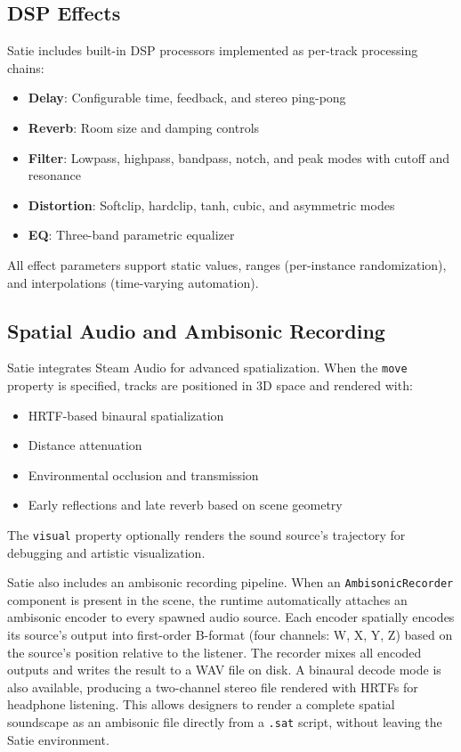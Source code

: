 \documentclass[sigconf,anonymous,review]{nimeart}
\begin{document}
\subsection{DSP Effects}

Satie includes built-in DSP processors implemented as per-track processing chains:

\begin{itemize}
    \item \textbf{Delay}: Configurable time, feedback, and stereo ping-pong
    \item \textbf{Reverb}: Room size and damping controls
    \item \textbf{Filter}: Lowpass, highpass, bandpass, notch, and peak modes with cutoff and resonance
    \item \textbf{Distortion}: Softclip, hardclip, tanh, cubic, and asymmetric modes
    \item \textbf{EQ}: Three-band parametric equalizer
\end{itemize}

All effect parameters support static values, ranges (per-instance randomization), and interpolations (time-varying automation).

\subsection{Spatial Audio and Ambisonic Recording}

Satie integrates Steam Audio for advanced spatialization. When the \texttt{move} property is specified, tracks are positioned in 3D space and rendered with:

\begin{itemize}
    \item HRTF-based binaural spatialization
    \item Distance attenuation
    \item Environmental occlusion and transmission
    \item Early reflections and late reverb based on scene geometry
\end{itemize}

The \texttt{visual} property optionally renders the sound source's trajectory for debugging and artistic visualization.

Satie also includes an ambisonic recording pipeline. When an \texttt{AmbisonicRecorder} component is present in the scene, the runtime automatically attaches an ambisonic encoder to every spawned audio source. Each encoder spatially encodes its source's output into first-order B-format (four channels: W, X, Y, Z) based on the source's position relative to the listener. The recorder mixes all encoded outputs and writes the result to a WAV file on disk. A binaural decode mode is also available, producing a two-channel stereo file rendered with HRTFs for headphone listening. This allows designers to render a complete spatial soundscape as an ambisonic file directly from a \texttt{.sat} script, without leaving the Satie environment.
\end{document}
